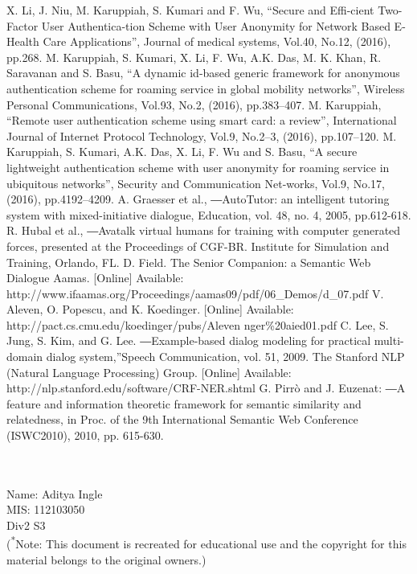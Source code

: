 \documentclass[conference]{IEEEtran}
\begin{document}
\begin{thebibliography}{00}
 X. Li, J. Niu, M. Karuppiah, S. Kumari and F. Wu, “Secure and Effi-cient Two-Factor User Authentica-tion Scheme with User Anonymity for Network Based E-Health Care Applications”, Journal of medical systems, Vol.40, No.12, (2016), pp.268.
 M. Karuppiah, S. Kumari, X. Li, F. Wu, A.K. Das, M. K. Khan, R. Saravanan and S. Basu, “A dynamic id-based generic framework for anonymous authentication scheme for roaming service in global mobility networks”, Wireless Personal Communications, Vol.93, No.2, (2016), pp.383–407.
 M. Karuppiah, “Remote user authentication scheme using smart card: a review”, International Journal of Internet Protocol Technology, Vol.9, No.2–3, (2016), pp.107–120.
 M. Karuppiah, S. Kumari, A.K. Das, X. Li, F. Wu and S. Basu, “A secure lightweight authentication scheme with user anonymity for roaming service in ubiquitous networks”, Security and Communication Net-works, Vol.9, No.17, (2016), pp.4192–4209.
 A. Graesser et al., ―AutoTutor: an intelligent tutoring system with mixed-initiative dialogue, Education, vol. 48, no. 4, 2005, pp.612-618.
 R. Hubal et al., ―Avatalk virtual humans for training with computer generated forces, presented at the Proceedings of CGF-BR. Institute for Simulation and Training, Orlando, FL.
 D. Field. The Senior Companion: a Semantic Web Dialogue Aamas.
[Online] Available:
http://www.ifaamas.org/Proceedings/aamas09/pdf/06\_Demos/d\_07.pdf
 V. Aleven, O. Popescu, and K. Koedinger. 
[Online] Available:
http://pact.cs.cmu.edu/koedinger/pubs/Aleven%
nger\%20aied01.pdf
 C. Lee, S. Jung, S. Kim, and G. Lee. ―Example-based dialog modeling for practical multi-domain dialog system,”Speech Communication, vol. 51, 2009.
 The Stanford NLP (Natural Language Processing) Group. [Online] Available: 
http://nlp.stanford.edu/software/CRF-NER.shtml
 G. Pirrò and J. Euzenat: ―A feature and information theoretic framework for semantic similarity and relatedness, in Proc. of the 9th International Semantic Web Conference (ISWC2010), 2010, pp.
615-630.\\\\\\
\end{thebibliography}
Name: Aditya Ingle\\
MIS: 112103050\\
Div2 S3\\{\footnotesize (\textsuperscript{*}Note: This document is recreated for educational use and the copyright for this material belongs to the original owners.)}
\end{document}
